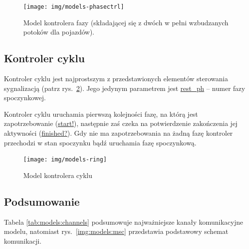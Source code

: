 \documentclass{pracamgr}
\newcommand{\imgr}[1]{rys.~\ref{#1}}
\newcommand{\todo}[1]{\textcolor{red}{#1}}
\theoremstyle{plain}
\begin{document}
\begin{figure}
  \centering
  \texttt{[image: img/models-phasectrl]}
  \caption{Model kontrolera fazy (składającej się z dwóch w pełni wzbudzanych potoków dla pojazdów).}
  \label{img:phase-ctrl}
\end{figure}

\subsection{Kontroler cyklu}
\label{ss:models:models:ring}
Kontroler cyklu jest najprostszym z przedstawionych elementów
sterowania sygnalizacją (patrz \imgr{img:ring-ctrl}). Jego jedynym
parametrem jest \url{rest_ph} -- numer fazy spoczynkowej.

Kontroler cyklu uruchamia pierwszą kolejności fazę, na którą
jest zapotrzebowanie (\url{start!}), następnie zaś czeka na
potwierdzenie zakończenia jej aktywności (\url{finished?}). Gdy nie ma
zapotrzebowania na żadną fazę kontroler przechodzi w stan spoczynku
bądź uruchamia fazę spoczynkową.

\begin{figure}
  \centering
  \texttt{[image: img/models-ring]}
  \caption{Model kontrolera cyklu}
  \label{img:ring-ctrl}
\end{figure}

\subsection{Podsumowanie}
\label{ss:models:models:summary}



Tabela \ref{tab:models:channels} podsumowuje najważniejsze kanały
komunikacyjne modelu, natomiast \imgr{img:models:msc} przedstawia
podstawowy schemat komunikacji.
\end{document}
